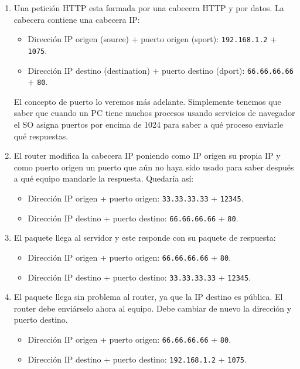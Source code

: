 \begin{enumerate}[label=(\arabic*)]
    \item Una petición HTTP esta formada por una cabecera HTTP y por datos. La cabecera contiene una cabecera IP:
        \begin{itemize}
            \item Dirección IP origen (source) + puerto origen (sport): \verb|192.168.1.2| + \verb|1075|.
            \item Dirección IP destino (destination) + puerto destino (dport): \verb|66.66.66.66| + \verb|80|.
        \end{itemize}
    El concepto de puerto lo veremos más adelante. Simplemente tenemos que saber que cuando un PC tiene muchos procesos usando servicios de navegador el SO asigna puertos por encima de 1024 para saber a qué proceso enviarle qué respuestas.
    \item El router modifica la cabecera IP poniendo como IP origen su propia IP y como puerto origen un puerto que aún no haya sido usado para saber después a qué equipo mandarle la respuesta. Quedaría así:
        \begin{itemize}
            \item Dirección IP origen + puerto origen: \verb|33.33.33.33| + \verb|12345|.
            \item Dirección IP destino + puerto destino: \verb|66.66.66.66| + \verb|80|.
        \end{itemize}
    
    \item El paquete llega al servidor y este responde con su paquete de respuesta:
        \begin{itemize}
            \item Dirección IP origen + puerto origen: \verb|66.66.66.66| + \verb|80|.
            \item Dirección IP destino + puerto destino: \verb|33.33.33.33| + \verb|12345|.
        \end{itemize}
    
    \item El paquete llega sin problema al router, ya que la IP destino es pública. El router debe enviárselo ahora al equipo. Debe cambiar de nuevo la dirección y puerto destino. 
        \begin{itemize}
            \item Dirección IP origen + puerto origen: \verb|66.66.66.66| + \verb|80|.
            \item Dirección IP destino + puerto destino: \verb|192.168.1.2| + \verb|1075|.
        \end{itemize}
\end{enumerate}

